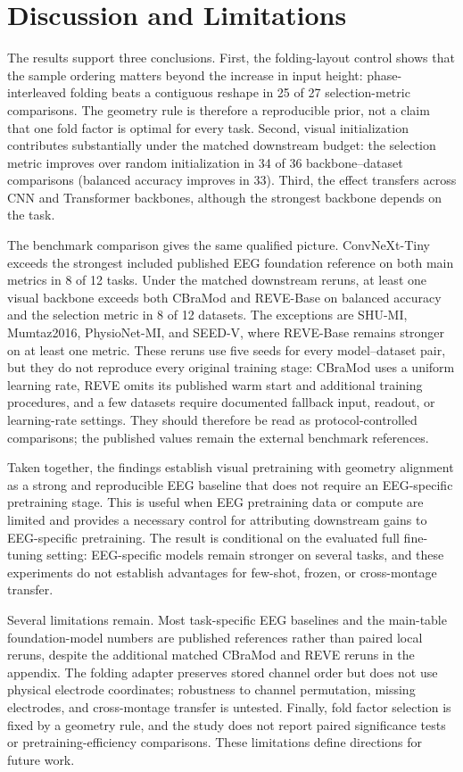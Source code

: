 \section{Discussion and Limitations}

The results support three conclusions. First, the folding-layout control shows that the sample ordering matters beyond the increase in input height: phase-interleaved folding beats a contiguous reshape in 25 of 27 selection-metric comparisons. The geometry rule is therefore a reproducible prior, not a claim that one fold factor is optimal for every task. Second, visual initialization contributes substantially under the matched downstream budget: the selection metric improves over random initialization in 34 of 36 backbone--dataset comparisons (balanced accuracy improves in 33). Third, the effect transfers across CNN and Transformer backbones, although the strongest backbone depends on the task.

The benchmark comparison gives the same qualified picture. ConvNeXt-Tiny exceeds the strongest included published EEG foundation reference on both main metrics in 8 of 12 tasks. Under the matched downstream reruns, at least one visual backbone exceeds both CBraMod and REVE-Base on balanced accuracy and the selection metric in 8 of 12 datasets. The exceptions are SHU-MI, Mumtaz2016, PhysioNet-MI, and SEED-V, where REVE-Base remains stronger on at least one metric. These reruns use five seeds for every model--dataset pair, but they do not reproduce every original training stage: CBraMod uses a uniform learning rate, REVE omits its published warm start and additional training procedures, and a few datasets require documented fallback input, readout, or learning-rate settings. They should therefore be read as protocol-controlled comparisons; the published values remain the external benchmark references.

Taken together, the findings establish visual pretraining with geometry alignment as a strong and reproducible EEG baseline that does not require an EEG-specific pretraining stage. This is useful when EEG pretraining data or compute are limited and provides a necessary control for attributing downstream gains to EEG-specific pretraining. The result is conditional on the evaluated full fine-tuning setting: EEG-specific models remain stronger on several tasks, and these experiments do not establish advantages for few-shot, frozen, or cross-montage transfer.

Several limitations remain. Most task-specific EEG baselines and the main-table foundation-model numbers are published references rather than paired local reruns, despite the additional matched CBraMod and REVE reruns in the appendix. The folding adapter preserves stored channel order but does not use physical electrode coordinates; robustness to channel permutation, missing electrodes, and cross-montage transfer is untested. Finally, fold factor selection is fixed by a geometry rule, and the study does not report paired significance tests or pretraining-efficiency comparisons. These limitations define directions for future work.
